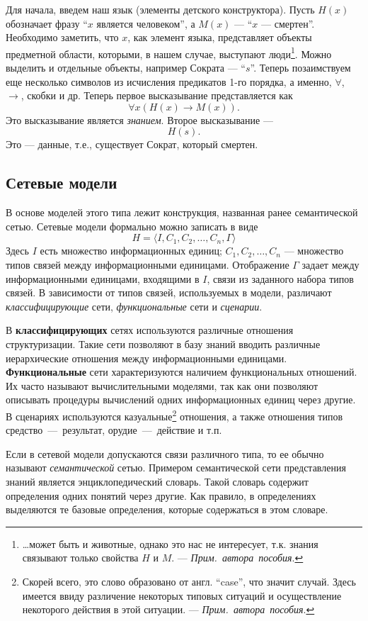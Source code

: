 \documentclass[12pt, openany, twoside]{book} %
\def\AR{{\em Прим.~автора~пособия}}
\begin{document}
Для начала, введем наш язык (элементы детского конструктора). Пусть $H(x)$ обозначает фразу ``$x$ является человеком'', а $M(x)$ --- ``$x$ --- смертен''. Необходимо заметить, что $x$, как элемент языка, представляет объекты предметной области, которыми, в нашем случае, выступают люди\footnote{\ldots может быть и животные, однако это нас не интересует, т.к. знания связывают только свойства $H$ и $M$. --- \AR.}. Можно выделить и отдельные объекты, например Сократа --- ``$s$''. Теперь позаимствуем еще несколько символов из исчисления предикатов 1-го порядка, а именно, $\forall$, $\to$, скобки и др. Теперь первое высказывание представляется как
$$
\forall x \left(H(x)\to M(x)\right).
$$
Это высказывание является {\em знанием}. Второе высказывание ---
$$
H(s).
$$
Это --- данные, т.е., существует Сократ, который смертен.

\subsection{Сетевые модели}

В основе моделей этого типа лежит конструкция, названная ранее семантической сетью. Сетевые модели формально можно записать в виде
$$
    H=\langle I, C_1, C_2, \ldots, C_n, \Gamma\rangle
$$
Здесь $I$ есть множество информационных единиц; $C_1, C_2, \ldots, C_n$ --- множество типов связей между информационными единицами. Отображение $\Gamma$ задает между информационными единицами, входящими в $I$, связи из заданного набора типов связей. В зависимости от типов связей, используемых в модели, различают {\em классифицирующие} сети, {\em функциональные} сети и {\em сценарии}.

В {\bf классифицирующих} сетях используются различные отношения структуризации. Такие сети позволяют в базу знаний вводить различные иерархические отношения между информационными единицами. {\bf Функциональные} сети характеризуются наличием функциональных отношений. Их часто называют вычислительными моделями, так как они позволяют описывать процедуры вычислений одних информационных единиц через другие. В сценариях используются казуальные\footnote{Скорей всего, это слово образовано от англ. ``case'', что значит случай. Здесь имеется ввиду различение некоторых типовых ситуаций и осуществление некоторого действия в этой ситуации. --- \AR.} отношения, а также отношения типов средство~---~результат, орудие~---~действие и т.п.

Если в сетевой модели допускаются связи различного типа, то ее обычно называют {\em семантической} сетью. Примером семантической сети представления знаний является энциклопедический словарь. Такой словарь содержит определения одних понятий через другие. Как правило, в определениях выделяются те базовые определения, которые содержаться в этом словаре.
\end{document}
